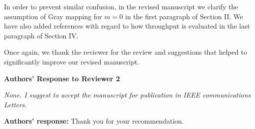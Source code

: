 \documentclass[onecolumn, 11pt, draftclsnofoot]{IEEEtran}
\begin{document}
In order to prevent similar confusion, in the revised manuscript we clarify the
assumption of Gray mapping for $m=0$ in the first paragraph of Section II. We
have also added references with regard to how throughput is evaluated in the
last paragraph of Section IV.
\vspace{0.5cm}


Once again, we thank the reviewer for the review and suggestions that helped to
significantly improve our revised manuscript. 

\begin{center}
{\LARGE \textbf{Authors' Response to Reviewer 2}}
\end{center}

\noindent
\emph{None. I suggest to accept the manuscript for publication in IEEE
communications Letters.}

\noindent \textbf{Authors' response:}
Thank you for your recommendation.

\vspace{0.5cm}

\newpage
\appendices
\end{document}
